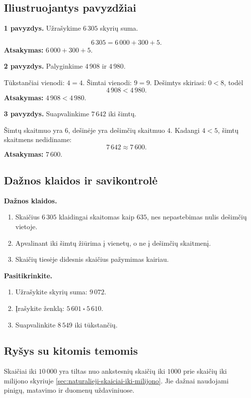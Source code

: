 \subsection{Iliustruojantys pavyzdžiai}

\textbf{1 pavyzdys.} Užrašykime \(6\,305\) skyrių suma.

\[
6\,305=6\,000+300+5.
\]
\textbf{Atsakymas:} \(6\,000+300+5\).

\textbf{2 pavyzdys.} Palyginkime \(4\,908\) ir \(4\,980\).

Tūkstančiai vienodi: \(4=4\). Šimtai vienodi: \(9=9\). Dešimtys skiriasi: \(0<8\), todėl
\[
4\,908<4\,980.
\]
\textbf{Atsakymas:} \(4\,908<4\,980\).

\textbf{3 pavyzdys.} Suapvalinkime \(7\,642\) iki šimtų.

Šimtų skaitmuo yra \(6\), dešinėje yra dešimčių skaitmuo \(4\). Kadangi \(4<5\), šimtų skaitmens nedidiname:
\[
7\,642\approx7\,600.
\]
\textbf{Atsakymas:} \(7\,600\).

\subsection{Dažnos klaidos ir savikontrolė}

\textbf{Dažnos klaidos.}
\begin{enumerate}[label=\arabic*.]
\item Skaičius \(6\,305\) klaidingai skaitomas kaip \(635\), nes nepastebimas nulis dešimčių vietoje.
\item Apvalinant iki šimtų žiūrima į vienetų, o ne į dešimčių skaitmenį.
\item Skaičių tiesėje didesnis skaičius pažymimas kairiau.
\end{enumerate}

\textbf{Pasitikrinkite.}
\begin{enumerate}[label=\arabic*.]
\item Užrašykite skyrių suma: \(9\,072\).
\item Įrašykite ženklą: \(5\,601\ \square\ 5\,610\).
\item Suapvalinkite \(8\,549\) iki tūkstančių.
\end{enumerate}

\subsection{Ryšys su kitomis temomis}

Skaičiai iki \(10\,000\) yra tiltas nuo ankstesnių skaičių iki \(1000\) prie skaičių iki milijono skyriuje \ref{sec:naturalieji-skaiciai-iki-milijono}. Jie dažnai naudojami pinigų, matavimo ir duomenų uždaviniuose.

